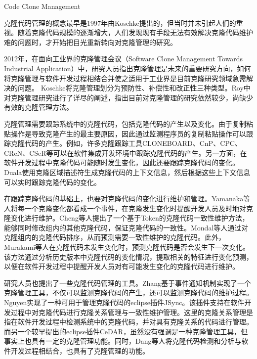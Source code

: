 {Code Clone Management}

克隆代码管理的概念最早是1997年由Koschke提出的\cite{koschke2008frontiers}，但当时并未引起人们的重视。随着克隆代码规模的逐渐增大，人们发现现有手段无法有效解决克隆代码维护难的问题时，才开始把目光重新转向对克隆管理的研究。

2012年，在面向工业界的克隆管理会议（Software Clone Management Towards Industrial Application）中，研究人员指出克隆管理是未来的重要研究方向，如何将克隆管理与软件开发过程相结合并使之适用于工业界是目前克隆研究领域急需解决的问题\cite{koschke2012software}。
Koschke将克隆管理划分为预防性、补偿性和改正性三种类型\cite{koschke2008frontiers}。Roy中对克隆管理研究进行了详尽的阐述，指出目前对克隆管理的研究依然较少，尚缺少有效的克隆管理方法\cite{roy2014vision}。

克隆管理需要跟踪系统中的克隆代码，包括克隆代码的产生以及变化。由于复制粘贴操作是导致克隆产生的最主要原因，因此通过监测程序员的复制粘贴操作可以跟踪克隆代码的产生。例如，许多克隆跟踪工具CLONEBOARD\cite{de2009managing}、CnP\cite{hou2009cnp}、CPC\cite{weckerle2008cpc}、CReN\cite{jablonski2007cren}、CSeR\cite{jacob2010actively}等可以在软件集成开发环境中跟踪克隆代码的产生。另一方面，在软件开发过程中克隆代码可能随时发生变化，因此还要跟踪克隆代码的变化。Duala使用克隆区域描述符生成克隆代码的上下文信息，然后根据这些上下文信息可以实时跟踪克隆代码的变化\cite{duala2008clonetracker}。

在跟踪克隆代码的基础上，也要对克隆代码的变化进行维护和管理。Yamanaka等人将每一个克隆变化都看成一个事件，在克隆发生变化时提醒开发人员及时地对克隆变化进行维护\cite{yamanaka2013applying}。Cheng等人提出了一个基于Token的克隆代码一致性维护方法，能够同时修改组内的其他克隆代码，保证克隆代码的一致性\cite{cheng2016rule}。Mondal等人通过对克隆组内的克隆代码排序，从而预测需要一致性维护的克隆代码\cite{mondal2014prediction}。此外，Murakami等人在克隆代码未发生变化时，预测克隆代码是否会发生下一次变化\cite{murakami2014predicting}。该方法通过分析历史版本中克隆代码的变化情况，提取相关的特征进行变化预测，以便在软件开发过程中提醒开发人员对有可能发生变化的克隆代码进行维护。

研究人员也提出了一些克隆代码管理的工具。Zhang基于事件通知机制实现了一个克隆管理工具，不仅可以监测克隆代码的产生，还可以监测克隆代码的维护过程\cite{zhang2013towards}。Nguyen实现了一种可用于管理克隆代码的eclipse插件JSync\cite{nguyen2012clone}。该插件支持在软件开发过程中对克隆代码进行克隆关系管理与一致性维护管理。这里的克隆关系管理是指在软件开发过程中检测系统中的克隆代码，并对具有克隆关系的代码进行管理。
而另一个较早提出的eclipse插件CeDAR\cite{tairas2012increasing,tairas2010representation}，虽然没有强调是一种克隆管理工具，但事实上也具有一定的克隆管理功能。同时，Dang等人将克隆代码检测和分析与软件开发过程相结合，也具有了克隆管理的功能\cite{dang2017transferring}。

